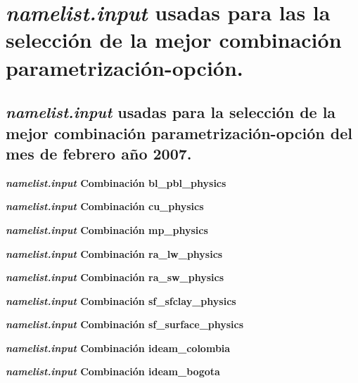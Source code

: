 

\chapter{\textit{namelist.input} usadas para las la selección de la mejor combinación parametrización-opción.}

\label{anexo:namelist_mejor_parametrizacion}

\section{\textit{namelist.input} usadas para la selección de la mejor combinación parametrización-opción del mes de febrero año 2007.}



\textbf{\textit{\textit{namelist.input}}  Combinación bl\_pbl\_physics}



\textbf{\textit{namelist.input}  Combinación cu\_physics}



\textbf{\textit{namelist.input}  Combinación mp\_physics}



\textbf{\textit{namelist.input}  Combinación ra\_lw\_physics}



\textbf{\textit{namelist.input}  Combinación ra\_sw\_physics}



\textbf{\textit{namelist.input}  Combinación sf\_sfclay\_physics}



\textbf{\textit{namelist.input}  Combinación sf\_surface\_physics}



\textbf{\textit{namelist.input}  Combinación ideam\_colombia}



\textbf{\textit{namelist.input}  Combinación ideam\_bogota}



